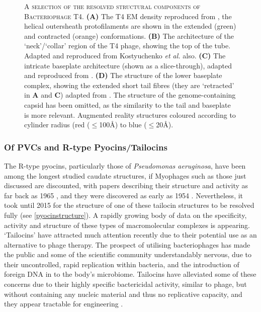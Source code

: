 \begin{figure}[p]
{{\begin{subfigure}[t]{0.45\textwidth}
        \end{subfigure}%
  }\cr
}
	\captionsetup{singlelinecheck=off, justification=justified, font=footnotesize, aboveskip=10pt}
	\caption[Resolved T4 Bacteriophage Structures from literature]{\textsc{\normalsize A selection of the resolved structural components of Bacteriophage T4.}\vspace{0.1cm} \newline \textbf{(A)} The T4 EM density reproduced from \cite{Kostyuchenko2005}, the helical outersheath protofilaments are shown in the extended (green) and contracted (orange) conformations. \textbf{(B)} The architecture of the `neck'/`collar' region of the T4 phage, showing the top of the tube. Adapted and  reproduced from Kostyuchenko \emph{et al.} also. \textbf{(C)} The intricate baseplate architecture (shown as a slice-through), adapted and reproduced from \cite{Kostyuchenko2003}. \textbf{(D)} The structure of the lower baseplate complex, showing the extended short tail fibres (they are `retracted' in \textbf{A} and \textbf{C}) adapted from \cite{Taylor2016}. The structure of the genome-containing capsid has been omitted, as the similarity to the tail and baseplate is more relevant. Augmented reality structures coloured according to cylinder radius (red ($\leq$100\AA) to blue ($\leq$20\AA). }
	\label{t4structure}
\end{figure}

\clearpage

\subsubsection{Of PVCs and R-type Pyocins/Tailocins}
The R-type pyocins, particularly those of \emph{Pseudomonas aeruginosa}, have been among the longest studied caudate structures, if Myophages such as those just discussed are discounted, with papers describing their structure and activity as far back as 1965 \citep{Ishii1965}, and they were discovered as early as 1954 \citep{jacob1954biosynthese}. Nevertheless, it took until 2015 for the structure of one of these tailocin structures to be resolved fully \citep{Ge2015} (see \vref{pyocinstructure}). A rapidly growing body of data on the specificity, activity and structure of these types of macromolecular complexes is appearing. `Tailocins' have attracted much attention recently due to their potential use as an alternative to phage therapy. The prospect of utilising bacteriophages has made the public and some of the scientific community understandably nervous, due to their uncontrolled, rapid replication within bacteria, and the introduction of foreign DNA in to the body's microbiome. Tailocins have alleviated some of these concerns due to their highly specific bactericidal activity, similar to phage, but without containing any nucleic material and thus no replicative capacity, and they appear tractable for engineering \citep{Scholl2008}.

